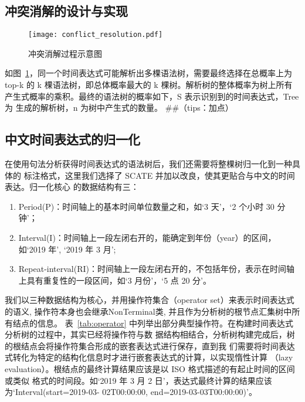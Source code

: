 \subsection{冲突消解的设计与实现}


\begin{figure}[h]
    \centering
    \texttt{[image: conflict\_resolution.pdf]}
    \caption{冲突消解过程示意图}
    \label{fig:conflict_resolution}
\end{figure}

如图~\ref{fig:conflict_resolution}，同一个时间表达式可能解析出多棵语法树，需要最终选择在总概率上为 top-k 的
k 棵语法树，即总体概率最大的 k 棵树。解析树的整体概率为树上所有产生式概率的乘积。最终的语法树的概率如下，S 表示识别到的时间表达式，Tree 为
生成的解析树，n 为树中产生式的数量。
##（tips：加点）




\subsection{中文时间表达式的归一化}

在使用句法分析获得时间表达式的语法树后，我们还需要将整棵树归一化到一种具体的
标注格式，这里我们选择了 SCATE 并加以改良，使其更贴合与中文的时间表达。归一化核心
的数据结构有三：
\begin{enumerate}
    \item Period(P)：时间轴上的基本时间单位数量之和，如‘3 天’，‘2 个小时 30 分钟’；
    \item Interval(I)：时间轴上一段左闭右开的，能确定到年份（year）的区间，如‘2019 年’, ‘2019 年 3 月’;
    \item Repeat-interval(RI)：时间轴上一段左闭右开的，不包括年份，表示在时间轴上具有重复性的一段区间，如‘3 月份’，‘5 点 20 分’。
\end{enumerate}

我们以三种数据结构为核心，并用操作符集合（operator set）来表示时间表达式的语义, 操作符本身也会继承NonTerminal类, 并且作为分析树的根节点汇集树中所有结点的信息。
表~\ref{tab:operator} 中列举出部分典型操作符。在构建时间表达式分析树的过程中，其实已经将操作符与数
据结构相结合，分析树构建完成后，树的根结点会将操作符集合形成的嵌套表达式进行保存，直到我
们需要将时间表达式转化为特定的结构化信息时才进行嵌套表达式的计算，以实现惰性计算
（lazy evaluation）。根结点的最终计算结果应该是以 ISO 格式描述的有起止时间的区间或类似
格式的时间段。如‘2019 年 3 月 2 日’，表达式最终计算的结果应该为‘Interval(start=2019-03-
02T00:00:00, end=2019-03-03T00:00:00)’。



